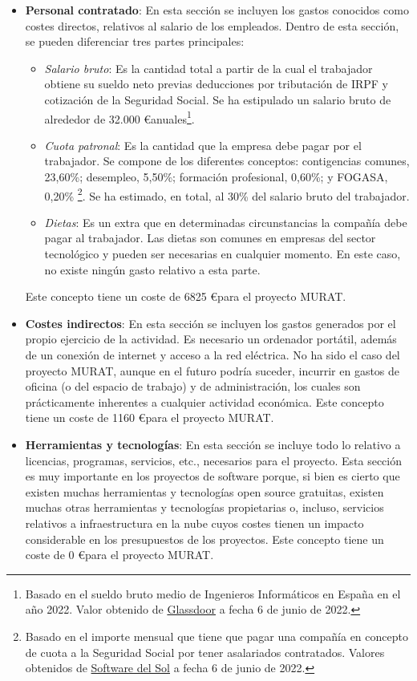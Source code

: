 \begin{itemize}
    \item \textbf{Personal contratado}: En esta sección se incluyen los gastos conocidos como costes directos, relativos al salario de los empleados. Dentro de esta sección, se pueden diferenciar tres partes principales:
    \begin{itemize}
        \item \textit{Salario bruto}: Es la cantidad total a partir de la cual el trabajador obtiene su sueldo neto previas deducciones por tributación de IRPF y cotización de la Seguridad Social. Se ha estipulado un salario bruto de alrededor de 32.000 \euro \space anuales\footnote{Basado en el sueldo bruto medio de Ingenieros Informáticos en España en el año 2022. Valor obtenido de \href{https://www.glassdoor.es/Sueldos/ingeniero-inform\%C3\%A1tico-sueldo-SRCH_KO0,21.htm}{Glassdoor} a fecha 6 de junio de 2022.}. \newpage
        \item \textit{Cuota patronal}: Es la cantidad que la empresa debe pagar por el trabajador. Se compone de los diferentes conceptos: contigencias comunes, 23,60\%; desempleo, 5,50\%; formación profesional, 0,60\%; y FOGASA, 0,20\% \footnote{Basado en el importe mensual que tiene que pagar una compañía en concepto de cuota a la Seguridad Social por tener asalariados contratados. Valores obtenidos de \href{https://www.sdelsol.com/glosario/cuota-patronal/}{Software del Sol} a fecha 6 de junio de 2022.}. Se ha estimado, en total, al 30\% del salario bruto del trabajador.
        \item \textit{Dietas}: Es un extra que en determinadas circunstancias la compañía debe pagar al trabajador. Las dietas son comunes en empresas del sector tecnológico y pueden ser necesarias en cualquier momento. En este caso, no existe ningún gasto relativo a esta parte.
    \end{itemize}
    Este concepto tiene un coste de 6825 \euro \space para el proyecto MURAT.
    \item \textbf{Costes indirectos}: En esta sección se incluyen los gastos generados por el propio ejercicio de la actividad. Es necesario un ordenador portátil, además de un conexión de internet y acceso a la red eléctrica. No  ha sido el caso del proyecto MURAT, aunque en el futuro podría suceder, incurrir en gastos de oficina (o del espacio de trabajo) y de administración, los cuales son prácticamente inherentes a cualquier actividad económica. Este concepto tiene un coste de 1160 \euro \space para el proyecto MURAT.
    \item \textbf{Herramientas y tecnologías}: En esta sección se incluye todo lo relativo a licencias, programas, servicios, etc., necesarios para el proyecto. Esta sección es muy importante en los proyectos de software porque, si bien es cierto que existen muchas herramientas y tecnologías open source gratuitas, existen muchas otras herramientas y tecnologías propietarias o, incluso, servicios relativos a infraestructura en la nube cuyos costes tienen un impacto considerable en los presupuestos de los proyectos. Este concepto tiene un coste de 0 \euro \space para el proyecto MURAT.
\end{itemize}

